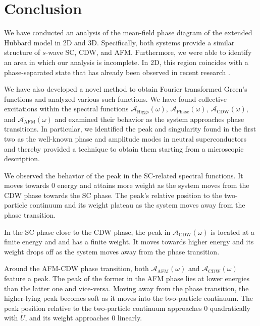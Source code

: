 \documentclass[
    reprint, 
    aps,
    preprintnumbers,
    twocolumn,
    prb,
    superscriptaddress
]{revtex4-2}
\newcommand{\spectral}[1]{\mathcal{A}_\text{#1}  (\omega)}
\begin{document}

\section{Conclusion}\label{sec:conclusion}


We have conducted an analysis of the mean-field phase diagram of the extended Hubbard model in 2D and 3D. 
Specifically, both systems provide a similar structure of $s$-wave SC, CDW, and AFM.
Furthermore, we were able to identify an area in which our analysis is incomplete.
In 2D, this region coincides with a phase-separated state that has already been observed in recent research \cite{Linner23}.

We have also developed a novel method to obtain Fourier transformed Green's functions and analyzed various such functions. 
We have found collective excitations within the spectral functions $\spectral{Higgs}$, $\spectral{Phase}$, $\spectral{CDW}$, and $\spectral{AFM}$ 
and examined their behavior as the system approaches phase transitions. 
In particular, we identified the peak and singularity found in the first two as the well-known phase and amplitude modes in neutral superconductors 
and thereby provided a technique to obtain them starting from a microscopic description.

We observed the behavior of the peak in the SC-related spectral functions.
It moves towards 0 energy and attains more weight as the system moves from the CDW phase towards the SC phase. 
The peak's relative position to the two-particle continuum and its weight plateau as the system moves away from the phase transition.

In the SC phase close to the CDW phase, the peak in $\spectral{CDW}$ is located at a finite energy and and has a finite weight. 
It moves towards higher energy and its weight drops off as the system moves away from the phase transition. 

Around the AFM-CDW phase transition, both $\spectral{AFM}$ and $\spectral{CDW}$ feature a peak. 
The peak of the former in the AFM phase lies at lower energies than the latter one and vice-versa. 
Moving away from the phase transition, the higher-lying peak becomes soft as it moves into the two-particle continuum. 
The peak position relative to the two-particle continuum approaches $0$ quadratically with $U$, and its weight approaches $0$ linearly.
\end{document}
